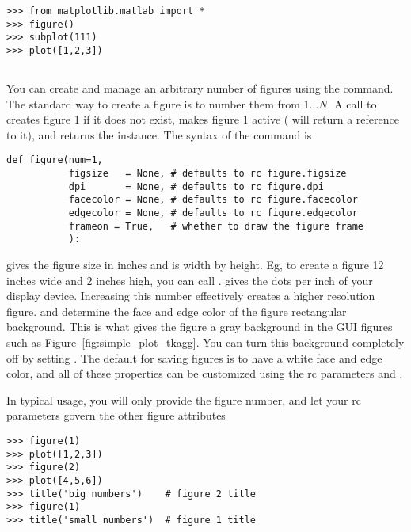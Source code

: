 \documentclass[]{book}
\begin{document}
\begin{lstlisting}
>>> from matplotlib.matlab import *
>>> figure()
>>> subplot(111)
>>> plot([1,2,3])
\end{lstlisting}

\subsection{}
\label{sec:figure}

You can create and manage an arbitrary number of figures using the
 command.  The standard way to create a figure is to
number them from $1 \dots N$.  A call to  creates
figure 1 if it does not exist, makes figure 1 active ( will
return a reference to it), and returns the
 instance.  The syntax of the
 command is

\begin{lstlisting}
def figure(num=1,
           figsize   = None, # defaults to rc figure.figsize
           dpi       = None, # defaults to rc figure.dpi
           facecolor = None, # defaults to rc figure.facecolor
           edgecolor = None, # defaults to rc figure.edgecolor
           frameon = True,   # whether to draw the figure frame
           ):
\end{lstlisting}
 gives the figure size in inches and is width by
height.  Eg, to create a figure 12 inches wide and 2 inches high, you
can call .   gives the dots per
inch of your display device.  Increasing this number effectively
creates a higher resolution figure.   and
 determine the face and edge color of the figure
rectangular background.  This is what gives the figure a gray
background in the GUI figures such as
Figure~\ref{fig:simple_plot_tkagg}.  You can turn this background
completely off by setting .  The default for
saving figures is to have a white face and edge color, and all of
these properties can be customized using the rc parameters
 and .

In typical usage, you will only provide the figure number, and let
your rc parameters govern the other figure attributes

\begin{lstlisting}
>>> figure(1)
>>> plot([1,2,3])
>>> figure(2)
>>> plot([4,5,6])
>>> title('big numbers')    # figure 2 title
>>> figure(1)
>>> title('small numbers')  # figure 1 title
\end{lstlisting}
\end{document}
